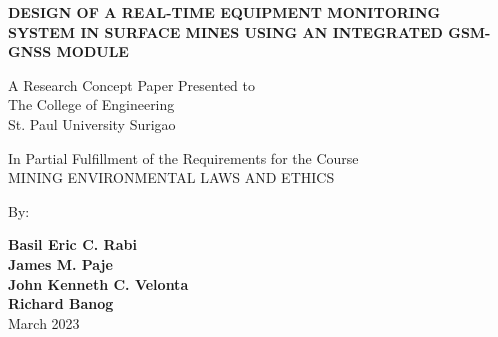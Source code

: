 \documentclass[12pt]{report}
\newcommand{\authora}{
    Basil Eric C. Rabi %
}
\newcommand{\authorb}{
    James M. Paje %
}
\newcommand{\authorc}{
    John Kenneth C. Velonta %
}
\newcommand{\authord}{
    Richard Banog %
}
\newcommand{\thetitle}{Design of a Real-Time Equipment Monitoring System in Surface Mines Using an Integrated GSM-GNSS Module}
\begin{document}
\thispagestyle{empty}

\begin{center}

\vspace*{1cm}
\textbf{\MakeUppercase{\thetitle}}

\vspace{1.5cm}
A Research Concept Paper Presented to \\
The College of Engineering \\
St. Paul University Surigao

\vfill

In Partial Fulfillment of the Requirements for the Course \\
MINING ENVIRONMENTAL LAWS AND ETHICS

\vspace{1cm}
By:

\vspace{1cm}
\textbf{\authora} \\
\textbf{\authorb} \\
\textbf{\authorc} \\
\textbf{\authord} \\

\vspace{1cm}
March 2023

\end{center}


\pagestyle{fancy}
\fancyhead{}
\fancyfoot{}
\fancyhead[R]{\thepage}

\tableofcontents

\end{document}

